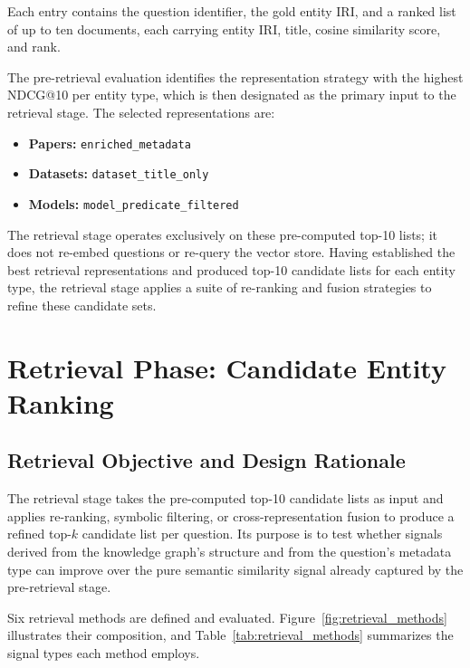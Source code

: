 Each entry contains the question identifier, the gold entity IRI, and a
ranked list of up to ten documents, each carrying entity IRI, title, cosine
similarity score, and rank.

The pre-retrieval evaluation identifies the representation strategy with the
highest NDCG@10 per entity type, which is then designated as the primary
input to the retrieval stage.
The selected representations are:
\begin{itemize}
  \item \textbf{Papers:} \texttt{enriched\_metadata}
  \item \textbf{Datasets:} \texttt{dataset\_title\_only}
  \item \textbf{Models:} \texttt{model\_predicate\_filtered}
\end{itemize}

The retrieval stage operates exclusively on these pre-computed top-10 lists;
it does not re-embed questions or re-query the vector store.
Having established the best retrieval representations and produced top-10
candidate lists for each entity type, the retrieval stage applies a suite of
re-ranking and fusion strategies to refine these candidate sets.

\section{Retrieval Phase: Candidate Entity Ranking}
\label{sec:retrieval}

\subsection{Retrieval Objective and Design Rationale}
\label{subsec:retrieval_objective}

The retrieval stage takes the pre-computed top-10 candidate lists as input
and applies re-ranking, symbolic filtering, or cross-representation fusion
to produce a refined top-$k$ candidate list per question.
Its purpose is to test whether signals derived from the knowledge graph's
structure and from the question's metadata type can improve over the pure
semantic similarity signal already captured by the pre-retrieval stage.

Six retrieval methods are defined and evaluated.
Figure~\ref{fig:retrieval_methods} illustrates their composition, and
Table~\ref{tab:retrieval_methods} summarizes the signal types each method
employs.

